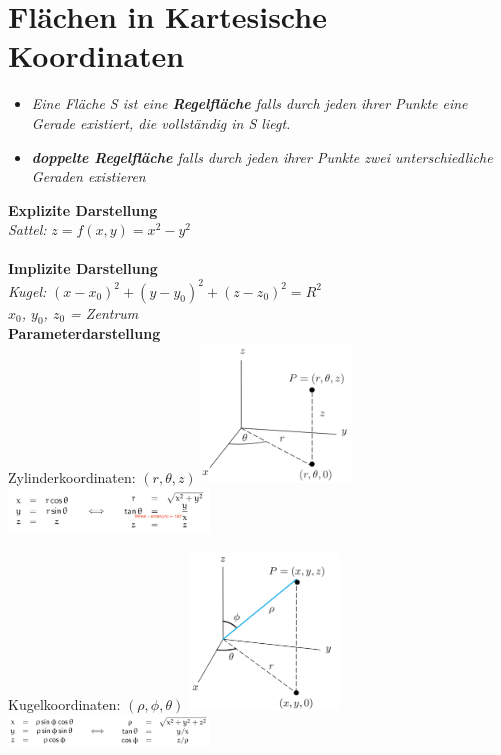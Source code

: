 \section{Flächen in Kartesische Koordinaten}

\begin{itemize}
	\item\textit{Eine Fläche S ist eine \textbf{Regelfläche} falls durch jeden ihrer Punkte eine Gerade existiert, die vollständig in S liegt.}
	\item\textit{\textbf{doppelte Regelfläche} falls durch jeden ihrer Punkte zwei unterschiedliche Geraden existieren}
\end{itemize}



\textbf{Explizite Darstellung} \\
\textit{Sattel:}
$z = f(x,y) = x^2 - y^2$ \\
\\
\textbf{Implizite Darstellung} \\
\textit{Kugel:}
$(x-x_0)^2 + (y-y_0)^2 + (z-z_0)^2 = R^2$ \\
\textit{$x_0$, $y_0$, $z_0$ = Zentrum}
\\
\textbf{Parameterdarstellung} \\

Zylinderkoordinaten:
\textit{$(r,\theta,z)$}
\includegraphics[width=0.3\textwidth]{assets/Zylinderkoordinaten.png}
\includegraphics[width=0.4\textwidth]{assets/ZylinderkoordinatenUmrechnnung.png}

Kugelkoordinaten:
\textit{$(\rho,\phi,\theta)$}
\includegraphics[width=0.3\textwidth]{assets/Kugelkoordinaten.png}
\includegraphics[width=0.4\textwidth]{assets/KugelkoordinatenUmrechnung.png}

